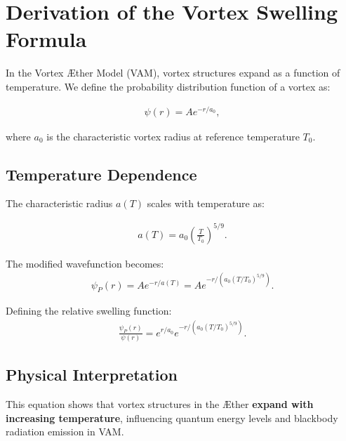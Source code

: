 

\section{Derivation of the Vortex Swelling Formula}

In the Vortex Æther Model (VAM), vortex structures expand as a function of temperature. We define the probability distribution function of a vortex as:

\begin{align}
    \psi(r) = A e^{-r/a_0},
\end{align}

where \( a_0 \) is the characteristic vortex radius at reference temperature \( T_0 \).

\subsection{Temperature Dependence}
The characteristic radius \( a(T) \) scales with temperature as:

\begin{align}
    a(T) = a_0 \left(\frac{T}{T_0}\right)^{5/9}.
\end{align}

The modified wavefunction becomes:
\begin{align}
    \psi_P(r) = A e^{-r/a(T)} = A e^{-r/(a_0 (T/T_0)^{5/9})}.
\end{align}

Defining the relative swelling function:
\begin{align}
    \frac{\psi_P(r)}{\psi(r)} = e^{r/a_0} e^{-r/(a_0 (T/T_0)^{5/9})}.
\end{align}

\subsection{Physical Interpretation}
This equation shows that vortex structures in the Æther \textbf{expand with increasing temperature}, influencing quantum energy levels and blackbody radiation emission in VAM.